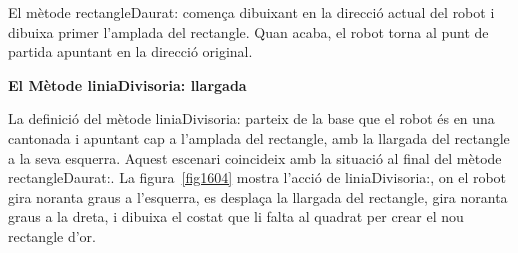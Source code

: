 
El mètode \textsf{rectangleDaurat:} comença dibuixant en la direcció actual del robot i dibuixa primer l'amplada del rectangle. Quan acaba, el robot torna al punt de partida apuntant en la direcció original.

\vspace*{3mm}
\noindent
{\bf \large El Mètode \textsf{liniaDivisoria: llargada}}
\vspace*{3mm}

La definició del mètode \textsf{liniaDivisoria:} parteix de la base que el robot és en una cantonada i apuntant cap a l'amplada del rectangle, amb la llargada del rectangle a la seva esquerra. Aquest escenari coincideix amb la situació al final del mètode \textsf{rectangleDaurat:}. La figura~\ref{fig1604} mostra l'acció de \textsf{liniaDivisoria:}, on el robot gira noranta graus a l'esquerra, es desplaça la llargada del rectangle, gira noranta graus a la dreta, i dibuixa el costat que li falta al quadrat per crear el nou rectangle d'or.

